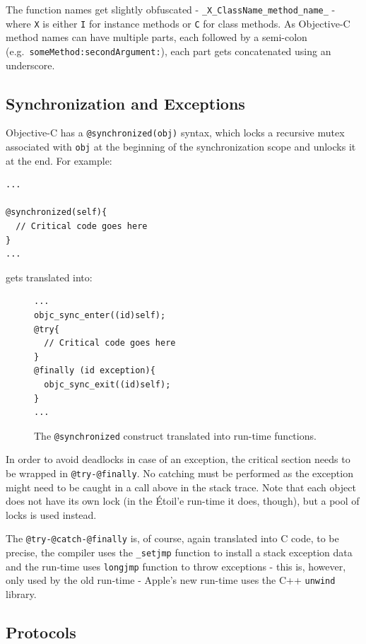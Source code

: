 The function names get slightly obfuscated - \verb=_X_ClassName_method_name_= - where \verb=X= is either \verb=I= for instance methods or \verb=C= for class methods. As Objective-C method names can have multiple parts, each followed by a semi-colon (e.g.\ \verb=someMethod:secondArgument:=), each part gets concatenated using an underscore.

\subsection{Synchronization and Exceptions}

Objective-C has a \verb=@synchronized(obj)= syntax, which locks a recursive mutex associated with \verb=obj= at the beginning of the synchronization scope and unlocks it at the end. For example:

\begin{verbatim}
...

@synchronized(self){
  // Critical code goes here
}
...
\end{verbatim}

gets translated into:

\begin{figure}[H]
\begin{verbatim}
...
objc_sync_enter((id)self);
@try{
  // Critical code goes here
}
@finally (id exception){
  objc_sync_exit((id)self);
}
...
\end{verbatim}
  \centering{}
  \caption{The \texttt{@synchronized} construct translated into run-time functions.}
  \label{fig:synchronized_translated}
\end{figure}

In order to avoid deadlocks in case of an exception, the critical section needs to be wrapped in \verb=@try-@finally=. No catching must be performed as the exception might need to be caught in a call above in the stack trace. Note that each object does not have its own lock (in the \'Etoil'e run-time it does, though), but a pool of locks is used instead.

The \verb=@try-@catch-@finally= is, of course, again translated into C code, to be precise, the compiler uses the \verb=_setjmp= function to install a stack exception data and the run-time uses \verb=longjmp= function to throw exceptions - this is, however, only used by the old run-time - Apple's new run-time uses the C++ \verb=unwind= library.

\subsection{Protocols}

